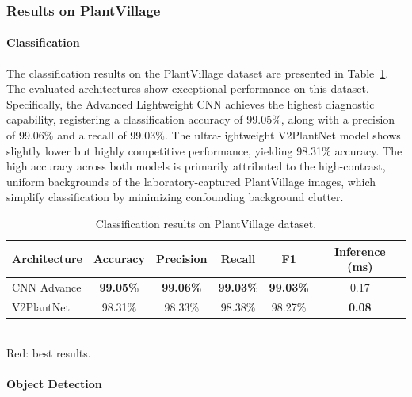 \documentclass[10pt, conference]{IEEEtran}
\begin{document}
\subsubsection{Results on PlantVillage}
\label{subsec:results_plantvillage}

\paragraph{Classification}

The classification results on the PlantVillage dataset are presented in Table~\ref{tab:cls_plantvillage}. The evaluated architectures show exceptional performance on this dataset. Specifically, the Advanced Lightweight CNN achieves the highest diagnostic capability, registering a classification accuracy of 99.05\%, along with a precision of 99.06\% and a recall of 99.03\%. The ultra-lightweight V2PlantNet model shows slightly lower but highly competitive performance, yielding 98.31\% accuracy. The high accuracy across both models is primarily attributed to the high-contrast, uniform backgrounds of the laboratory-captured PlantVillage images, which simplify classification by minimizing confounding background clutter.

\begin{table}[t]
    \centering
    \caption{Classification results on PlantVillage dataset.}
    \label{tab:cls_plantvillage}
    \setlength{\tabcolsep}{5pt}
    \begin{tabular}{lccccc}
        \toprule
        \textbf{Architecture} & \textbf{Accuracy} & \textbf{Precision}
                              & \textbf{Recall} & \textbf{F1}
                              & \textbf{Inference (ms)} \\
        \midrule
        CNN Advance
            & \textcolor{bestred}{\textbf{99.05\%}}
            & \textcolor{bestred}{\textbf{99.06\%}}
            & \textcolor{bestred}{\textbf{99.03\%}}
            & \textcolor{bestred}{\textbf{99.03\%}}
            & 0.17 \\
        V2PlantNet
            & 98.31\% & 98.33\% & 98.38\% & 98.27\% & \textcolor{bestred}{\textbf{0.08}} \\
        \bottomrule
    \end{tabular}\\[4pt]
    {\small \textcolor{bestred}{Red}: best results.}
\end{table}

\paragraph{Object Detection}
\end{document}
